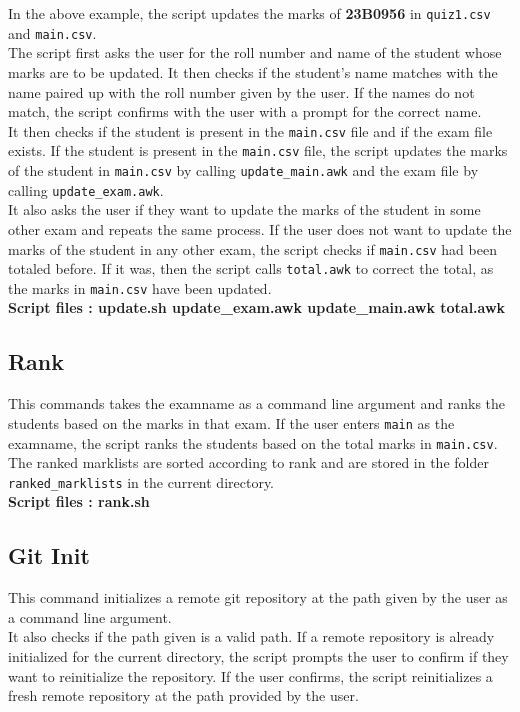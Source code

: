 \documentclass{article}
\begin{document}
In the above example, the script updates the marks of \textbf{23B0956} in \verb"quiz1.csv" and \verb"main.csv".\\
The script first asks the user for the roll number and name of the student whose marks are to be updated. It then checks if the student's name matches with the name paired up with the roll number given by the user. If the names do not match, the script confirms with the user with a prompt for the correct name.\\
It then checks if the student is present in the \verb"main.csv" file and if the exam file exists. If the student is present in the \verb"main.csv" file, the script updates the marks of the student in \verb"main.csv" by calling \verb"update_main.awk" and the exam file by calling \verb"update_exam.awk".\\
It also asks the user if they want to update the marks of the student in some other exam and repeats the same process. If the user does not want to update the marks of the student in any other exam, the script checks if \verb"main.csv" had been totaled before. If it was, then the script calls \verb"total.awk" to correct the total, as the marks in \verb"main.csv" have been updated.\\

\textbf{Script files : update.sh update\_exam.awk update\_main.awk total.awk} 

\subsection{Rank}
This commands takes the examname as a command line argument and ranks the students based on the marks in that exam.
If the user enters \verb"main" as the examname, the script ranks the students based on the total marks in \verb"main.csv". The ranked marklists are sorted according to rank and are stored in the folder \verb"ranked_marklists" in the current directory.\\

\textbf{Script files : rank.sh }

\subsection{Git Init}
This command initializes a remote git repository at the path given by the user as a command line argument.\\
It also checks if the path given is a valid path. If a remote repository is already initialized for the current directory, the script prompts the user to confirm if they want to reinitialize the repository.
If the user confirms, the script reinitializes a fresh remote repository at the path provided by the user.\\ 
\end{document}
